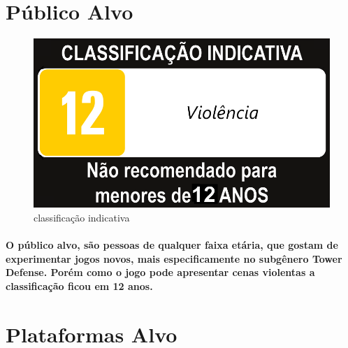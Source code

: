 \documentclass[11pt]{article} %
\begin{document}
\section*{Público Alvo}
\begin{figure}[!htp]
\begin{center}
\includegraphics[scale=0.1]{res/12anos.png} 
\caption{classificação indicativa} \label{gdimotes}
\end{center}
\end{figure}
\paragraph{O público alvo, são pessoas de qualquer faixa etária, que gostam de experimentar jogos novos, mais especificamente no subgênero Tower Defense. Porém como o jogo pode apresentar cenas violentas a classificação ficou em 12 anos.}

\section*{Plataformas Alvo}
\end{document}
